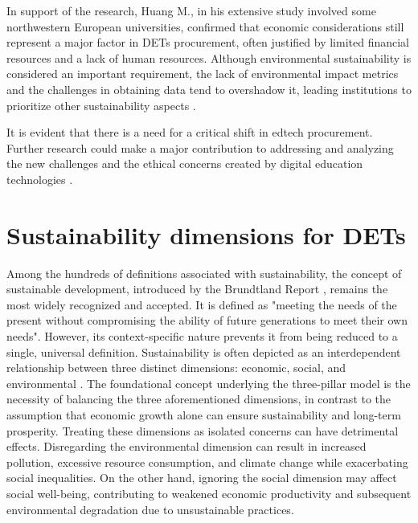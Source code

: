 In support of the research, Huang M., in his extensive study involved some northwestern European universities, confirmed that economic considerations still represent a major factor in DETs procurement, often justified by limited financial resources and a lack of human resources. Although environmental sustainability is considered an important requirement, the lack of environmental impact metrics and the challenges in obtaining data tend to overshadow it, leading institutions to prioritize other sustainability aspects \cite{huang_building_2023-1}.

It is evident that there is a need for a critical shift in edtech procurement. Further research could make a major contribution to addressing and analyzing the new challenges and the ethical concerns created by digital education technologies \cite{teras_post-covid-19_2020}. 

\section{Sustainability dimensions for DETs}
\label{sec:2.3_sustainability_dimensions_DETs}
Among the hundreds of definitions associated with sustainability, the concept of sustainable development, introduced by the Brundtland Report \cite{are_1987_nodate}, remains the most widely recognized and accepted. It is defined as "meeting the needs of the present without compromising the ability of future generations to meet their own needs". However, its context-specific nature prevents it from being reduced to a single, universal definition. Sustainability is often depicted as an interdependent relationship between three distinct dimensions: economic, social, and environmental \cite{purvis_three_2019}. The foundational concept underlying the three-pillar model is the necessity of balancing the three aforementioned dimensions, in contrast to the assumption that economic growth alone can ensure sustainability and long-term prosperity. Treating these dimensions as isolated concerns can have detrimental effects. Disregarding the environmental dimension can result in increased pollution, excessive resource consumption, and climate change while exacerbating social inequalities. On the other hand, ignoring the social dimension may affect social well-being, contributing to weakened economic productivity and subsequent environmental degradation due to unsustainable practices.


